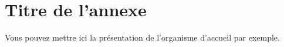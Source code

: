 \chapter{Titre de l'annexe}

Vous pouvez mettre ici la présentation de l'organisme d'accueil par exemple. 